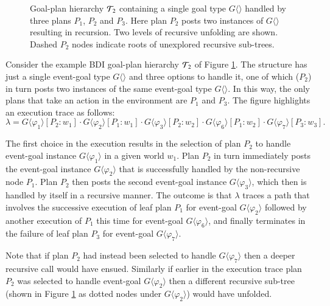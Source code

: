 \begin{figure}[t]
\begin{center}
\resizebox{0.8\textwidth}{!}{

}
\end{center}
\caption{Goal-plan hierarchy ${\mathcal{T}}_2$ containing a single goal type $G\langle\rangle$ handled by three plans $P_1$, $P_2$ and $P_3$. Here plan $P_2$ posts two instances of $G\langle\rangle$ resulting in recursion. Two levels of recursive unfolding are shown. Dashed $P_2$ nodes indicate roots of unexplored recursive sub-trees.}
\label{fig:unfolding}
\end{figure}

Consider the example BDI goal-plan hierarchy ${\mathcal{T}}_2$ of Figure \ref{fig:unfolding}. The structure has just a single event-goal type $G\langle\rangle$ and three options to handle it, one of which ($P_2$) in turn posts two instances of the same event-goal type $G\langle\rangle$. In this way, the only plans that take an action in the environment are $P_1$ and $P_3$. The figure highlights an execution trace as follows: \[
\lambda=G\langle\varphi_1\rangle[P_2:w_1] \cdot G\langle\varphi_2\rangle[P_1:w_1] \cdot G\langle\varphi_3\rangle[P_2:w_2] \cdot G\langle\varphi_6\rangle[P_1:w_2] \cdot G\langle\varphi_7\rangle[P_3:w_3].
\]

The first choice in the execution results in the selection of plan $P_2$ to handle event-goal instance $G\langle\varphi_1\rangle$ in a given world $w_1$. Plan $P_2$ in turn immediately posts the event-goal instance $G\langle\varphi_2\rangle$ that is successfully handled by the non-recursive node $P_1$. Plan $P_2$ then posts the second event-goal instance $G\langle\varphi_3\rangle$, which then is handled by itself in a recursive manner.  The outcome is that $\lambda$ traces a path that involves the successive execution of leaf plan $P_1$ for event-goal $G\langle\varphi_2\rangle$ followed by another execution of $P_1$ this time for event-goal $G\langle\varphi_6\rangle$, and finally terminates in the failure of leaf plan $P_3$ for event-goal $G\langle\varphi_7\rangle$. 

Note that if plan $P_2$ had instead been selected to handle $G\langle\varphi_7\rangle$ then a deeper recursive call would have ensued. Similarly if earlier in the execution trace plan $P_2$ was selected to handle event-goal $G\langle\varphi_2\rangle$ then a different recursive sub-tree (shown in Figure \ref{fig:unfolding} as dotted nodes under $G\langle\varphi_2\rangle$) would have unfolded.


